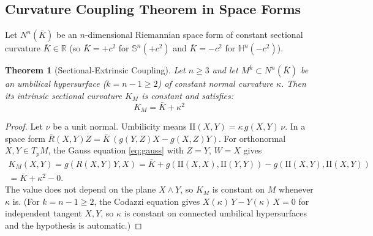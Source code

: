 \documentclass[11pt,reqno]{amsart}
\newtheorem{theorem}{Theorem}[section]
\theoremstyle{definition}
\providecommand{\R}{\mathbb{R}}
\providecommand{\Hyp}{\mathbb{H}}
\providecommand{\Sph}{\mathbb{S}}
\providecommand{\II}{\mathrm{I\!I}}
\numberwithin{equation}{section}
\providecommand{\Hyp}{\mathbb{H}}
\providecommand{\Sph}{\mathbb{S}}
\providecommand{\II}{\mathrm{II}}
\providecommand{\R}{\mathbb{R}}
\begin{document}
\subsection{Curvature Coupling Theorem in Space Forms}
Let $N^n(\bar K)$ be an $n$-dimensional Riemannian space form of constant sectional curvature $\bar K \in \R$ (so $\bar K = +c^2$ for $\Sph^n(+c^2)$ and $\bar K = -c^2$ for $\Hyp^n(-c^2)$).
\begin{theorem}[Sectional-Extrinsic Coupling]
\label{thm:sectional_extrinsic}
Let $n \ge 3$ and let $M^k \subset N^n(\bar K)$ be an umbilical hypersurface ($k = n-1 \ge 2$) of constant normal curvature $\kappa$. Then its intrinsic sectional curvature $K_M$ is constant and satisfies:
\begin{equation}
K_M = \bar K + \kappa^2
\end{equation}
\end{theorem}
\begin{proof}
Let $\nu$ be a unit normal. Umbilicity means $\II(X,Y) = \kappa\, g(X,Y)\,\nu$. In a space form $\bar{R}(X,Y)Z = \bar K\,(g(Y,Z)X - g(X,Z)Y)$. For orthonormal $X, Y \in T_pM$, the Gauss equation \eqref{eq:gauss} with $Z = Y$, $W = X$ gives
\begin{multline*}
K_M(X,Y) = g(R(X,Y)Y,X) = \bar K + g(\II(X,X),\II(Y,Y)) - g(\II(X,Y),\II(X,Y)) \\
= \bar K + \kappa^2 - 0 .
\end{multline*}
The value does not depend on the plane $X \wedge Y$, so $K_M$ is constant on $M$ whenever $\kappa$ is. (For $k = n-1 \ge 2$, the Codazzi equation gives $X(\kappa)\,Y - Y(\kappa)\,X = 0$ for independent tangent $X, Y$, so $\kappa$ is constant on connected umbilical hypersurfaces and the hypothesis is automatic.)
\end{proof}
\end{document}
